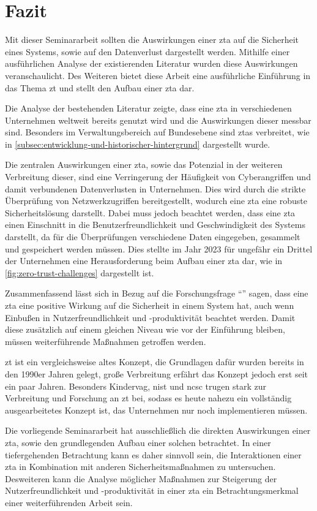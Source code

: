 \newpage
\section{Fazit}\label{sec:fazit}

Mit dieser Seminararbeit sollten die Auswirkungen einer \ac{zta} auf die Sicherheit eines Systems, sowie auf den Datenverlust dargestellt werden.
Mithilfe einer ausführlichen Analyse der existierenden Literatur wurden diese Auswirkungen veranschaulicht.
Des Weiteren bietet diese Arbeit eine ausführliche Einführung in das Thema \ac{zt} und stellt den Aufbau einer \ac{zta} dar.

Die Analyse der bestehenden Literatur zeigte, dass eine \ac{zta} in verschiedenen Unternehmen weltweit bereits genutzt wird und die Auswirkungen dieser messbar sind.
Besonders im Verwaltungsbereich auf Bundesebene sind \acp{zta} verbreitet, wie in \autoref{subsec:entwicklung-und-historischer-hintergrund} dargestellt wurde.

Die zentralen Auswirkungen einer \ac{zta}, sowie das Potenzial in der weiteren Verbreitung dieser, sind eine Verringerung der Häufigkeit von Cyberangriffen und damit verbundenen Datenverlusten in Unternehmen.
Dies wird durch die strikte Überprüfung von Netzwerkzugriffen bereitgestellt, wodurch eine \ac{zta} eine robuste Sicherheitslösung darstellt.
Dabei muss jedoch beachtet werden, dass eine \ac{zta} einen Einschnitt in die Benutzerfreundlichkeit und Geschwindigkeit des Systems darstellt, da für die Überprüfungen verschiedene Daten eingegeben, gesammelt und gespeichert werden müssen.
Dies stellte im Jahr 2023 für ungefähr ein Drittel der Unternehmen eine Herausforderung beim Aufbau einer \ac{zta} dar, wie in \autoref{fig:zero-trust-challenges} dargestellt ist.

Zusammenfassend lässt sich in Bezug auf die Forschungsfrage \enquote{\myForschungsfrage} sagen, dass eine \ac{zta} eine positive Wirkung auf die Sicherheit in einem System hat, auch wenn Einbußen in Nutzerfreundlichkeit und -produktivität beachtet werden.
Damit diese zusätzlich auf einem gleichen Niveau wie vor der Einführung bleiben, müssen weiterführende Maßnahmen getroffen werden.

\ac{zt} ist ein vergleichsweise altes Konzept, die Grundlagen dafür wurden bereits in den 1990er Jahren gelegt, große Verbreitung erfährt das Konzept jedoch erst seit ein paar Jahren.
Besonders Kindervag, \ac{nist} und \ac{ncsc} trugen stark zur Verbreitung und Forschung an \ac{zt} bei, sodass es heute nahezu ein vollständig ausgearbeitetes Konzept ist, das Unternehmen nur noch implementieren müssen.\autocites{kindervag-2010}{NIST:800207}{ncsc-2021}

Die vorliegende Seminararbeit hat ausschließlich die direkten Auswirkungen einer \ac{zta}, sowie den grundlegenden Aufbau einer solchen betrachtet.
In einer tiefergehenden Betrachtung kann es daher sinnvoll sein, die Interaktionen einer \ac{zta} in Kombination mit anderen Sicherheitsmaßnahmen zu untersuchen.
Desweiteren kann die Analyse möglicher Maßnahmen zur Steigerung der Nutzerfreundlichkeit und -produktivität in einer \ac{zta} ein Betrachtungsmerkmal einer weiterführenden Arbeit sein.
